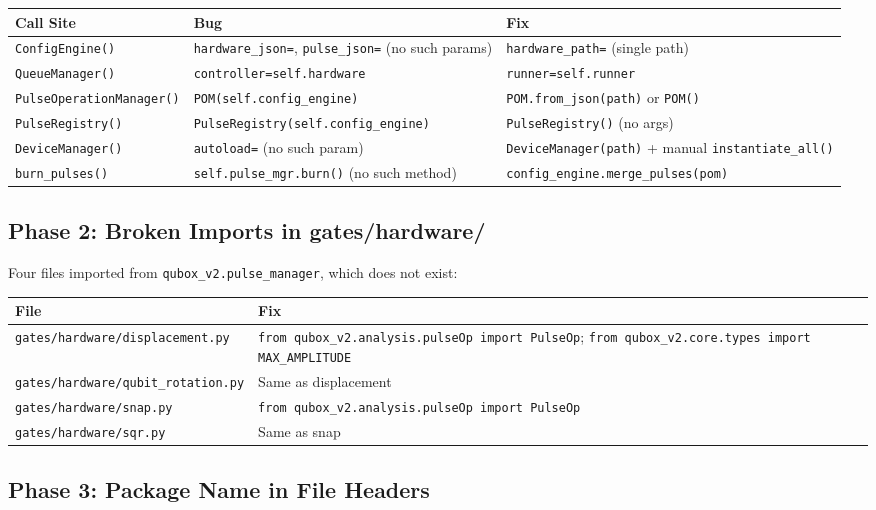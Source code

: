 \documentclass[11pt]{article}
\begin{document}
\begin{longtable}{p{5cm}p{4cm}p{5cm}}
\toprule
\textbf{Call Site} & \textbf{Bug} & \textbf{Fix} \\
\midrule
\endhead
\texttt{ConfigEngine()} &
  \texttt{hardware\_json=}, \texttt{pulse\_json=} (no such params) &
  \texttt{hardware\_path=} (single path) \\
\texttt{QueueManager()} &
  \texttt{controller=self.hardware} &
  \texttt{runner=self.runner} \\
\texttt{PulseOperationManager()} &
  \texttt{POM(self.config\_engine)} &
  \texttt{POM.from\_json(path)} or \texttt{POM()} \\
\texttt{PulseRegistry()} &
  \texttt{PulseRegistry(self.config\_engine)} &
  \texttt{PulseRegistry()} (no args) \\
\texttt{DeviceManager()} &
  \texttt{autoload=} (no such param) &
  \texttt{DeviceManager(path)} + manual \texttt{instantiate\_all()} \\
\texttt{burn\_pulses()} &
  \texttt{self.pulse\_mgr.burn()} (no such method) &
  \texttt{config\_engine.merge\_pulses(pom)} \\
\bottomrule
\end{longtable}

\subsection{Phase 2: Broken Imports in gates/hardware/}

Four files imported from \texttt{qubox\_v2.pulse\_manager}, which does not exist:

\begin{longtable}{lp{9cm}}
\toprule
\textbf{File} & \textbf{Fix} \\
\midrule
\endhead
\texttt{gates/hardware/displacement.py} &
  \texttt{from qubox\_v2.analysis.pulseOp import PulseOp};
  \texttt{from qubox\_v2.core.types import MAX\_AMPLITUDE} \\
\texttt{gates/hardware/qubit\_rotation.py} & Same as displacement \\
\texttt{gates/hardware/snap.py} &
  \texttt{from qubox\_v2.analysis.pulseOp import PulseOp} \\
\texttt{gates/hardware/sqr.py} & Same as snap \\
\bottomrule
\end{longtable}

\subsection{Phase 3: Package Name in File Headers}
\end{document}
